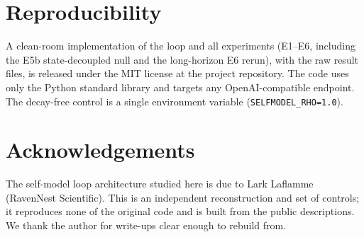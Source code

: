\documentclass[11pt]{article}
\begin{document}
\section*{Reproducibility}
A clean-room implementation of the loop and all experiments (E1--E6, including
the E5b state-decoupled null and the long-horizon E6 rerun), with the raw
result files, is released under the MIT license at the project repository. The
code uses only the Python standard library and targets any OpenAI-compatible
endpoint. The decay-free control is a single environment variable
(\texttt{SELFMODEL\_RHO=1.0}).

\section*{Acknowledgements}
The self-model loop architecture studied here is due to Lark Laflamme (RavenNest
Scientific). This is an independent reconstruction and set of controls; it
reproduces none of the original code and is built from the public descriptions.
We thank the author for write-ups clear enough to rebuild from.
\end{document}
